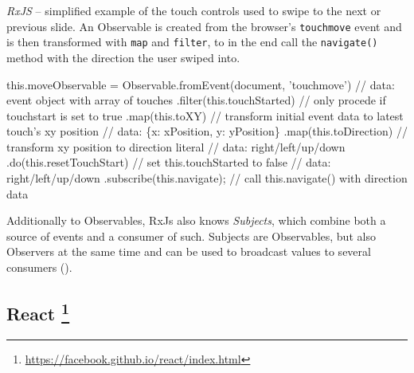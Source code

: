 \begin{program}
\caption{\emph{RxJS} -- simplified example of the touch controls used to swipe to the next or previous slide. An Observable is created from the browser's \texttt{touchmove} event and is then transformed with \texttt{map} and \texttt{filter}, to in the end call the \texttt{navigate()} method with the direction the user swiped into.}
\label{prog:implementation-technologies-rxjs}
\begin{JsCode}
this.moveObservable = Observable.fromEvent(document, 'touchmove')
  // data: event object with array of touches
  .filter(this.touchStarted) // only procede if touchstart is set to true
  .map(this.toXY) // transform initial event data to latest touch's xy position
  // data: \{x: xPosition, y: yPosition\}
  .map(this.toDirection) // transform xy position to direction literal
  // data: right/left/up/down
  .do(this.resetTouchStart) // set this.touchStarted to false
  // data: right/left/up/down
  .subscribe(this.navigate); // call this.navigate() with direction data
\end{JsCode}
\end{program}

Additionally to Observables, RxJs also knows \emph{Subjects}, which combine both a source of events and a consumer of such. Subjects are Observables, but also Observers at the same time and can be used to broadcast values to several consumers (\cite{rxjs-docu}).

\subsection[React]%
             {React%
             \protect\footnote{\url{https://facebook.github.io/react/index.html}}}%
\label{sec:implementation-technologies-react}

